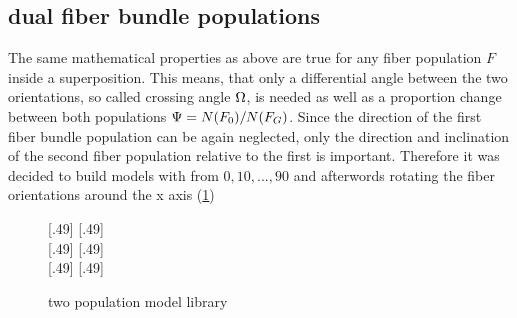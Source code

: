 \subsection{dual fiber bundle populations}
The same mathematical properties as above are true for any fiber population $F$ inside a superposition.
This means, that only a differential angle between the two orientations, so called crossing angle $\textnormal{$\Omega$}$, is needed as well as a proportion change between both populations $\textnormal{$\Psi$}{} = N(F_0)/N(F_G)$.
% 
Since the direction of the first fiber bundle population can be again neglected, only the direction and inclination of the second fiber population relative to the first is important. Therefore it was decided to build models with \modelOmega{} from ${0,10,...,90}$ and afterwords rotating the fiber orientations around the x axis (\cref{fig:twomodelpop})
% 
% 
\begin{figure}[p]
\centering
\def\tikzwidth{0.42*\textwidth}
[.49\textwidth]{}\hfill
{}
[.49\textwidth]{}
\\
% 
[.49\textwidth]{}\hfill
{}
[.49\textwidth]{}
\\
% 
\def\tikzwidth{0.35*\textwidth}
[.49\textwidth]{}\hfill
{}
[.49\textwidth]{}
\caption{two population model library  }
\label{fig:twomodelpop}
\end{figure}
% 
%  
% 
